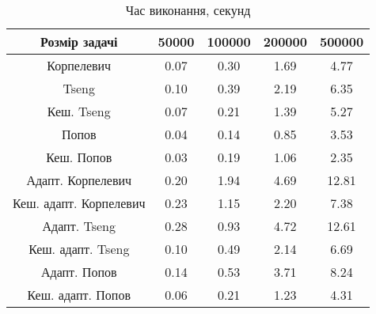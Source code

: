 \begin{table}[H]
	\centering
	\begin{tabular}{|c||c|c|c|c|}\hline
		Розмір задачі & 50000 & 100000 & 200000 & 500000 \\ \hline \hline
		Корпелевич & 0.07 & 0.30 & 1.69 & 4.77 \\ \hline
		Tseng & 0.10 & 0.39 & 2.19 & 6.35 \\ \hline
		Кеш. Tseng & 0.07 & 0.21 & 1.39 & 5.27 \\ \hline
		Попов & 0.04 & 0.14 & 0.85 & 3.53 \\ \hline
		Кеш. Попов & 0.03 & 0.19 & 1.06 & 2.35 \\ \hline \hline
		Адапт. Корпелевич & 0.20 & 1.94 & 4.69 & 12.81 \\ \hline
		Кеш. адапт. Корпелевич & 0.23 & 1.15 & 2.20 & 7.38 \\ \hline
		Адапт. Tseng & 0.28 & 0.93 & 4.72 & 12.61 \\ \hline
		Кеш. адапт. Tseng & 0.10 & 0.49 & 2.14 & 6.69 \\ \hline
		Адапт. Попов & 0.14 & 0.53 & 3.71 & 8.24 \\ \hline
		Кеш. адапт. Попов & 0.06 & 0.21 & 1.23 & 4.31 \\ \hline
	\end{tabular}
	\caption{Час виконання, секунд}
\end{table}
